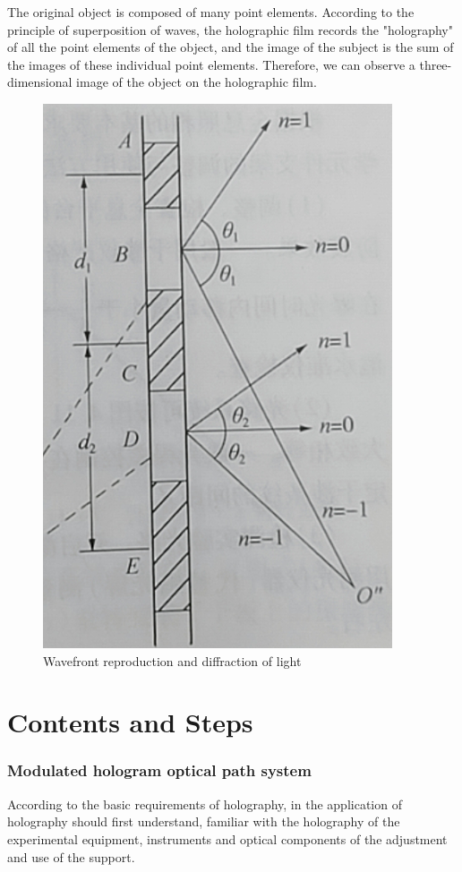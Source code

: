 \documentclass[UTF8]{article}
\begin{document}
   The original object is composed of many point elements. According to the principle of superposition of waves, the holographic film records the "holography" of all the point elements of the object, and the image of the subject is the sum of the images of these individual point elements. Therefore, we can observe a three-dimensional image of the object on the holographic film.
      	\begin{figure}[H]
          	    	\centering
          	    	\includegraphics[clip,scale=0.8,trim={0 0 0 0}]{fig/fig5.png}
          	        \caption{Wavefront reproduction and diffraction of light}
          	        \label{figure.14}
              \end{figure}
   
               
	\section{Contents and Steps}
    \subsubsection{Modulated hologram optical path system}
    According to the basic requirements of holography, in the application of holography should first understand, familiar with the holography of the experimental equipment, instruments and optical components of the adjustment and use of the support.
    
\end{document}
